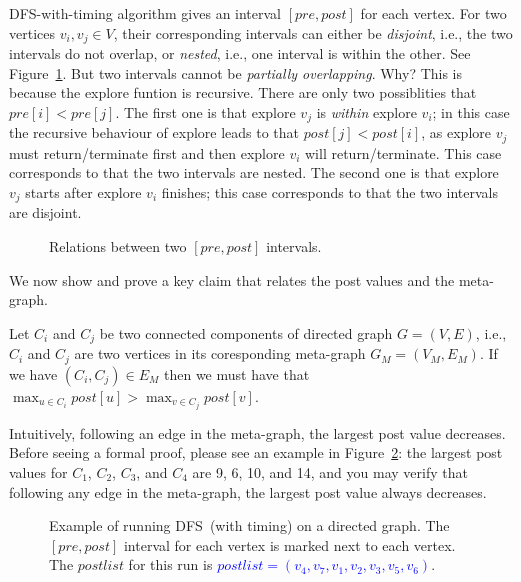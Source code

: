 DFS-with-timing algorithm gives an interval $[pre,post]$ for each vertex.
For two vertices $v_i,v_j\in V$, their corresponding intervals can either be
\emph{disjoint}, i.e., the two intervals do not overlap, or \emph{nested}, i.e.,
one interval is within the other. See Figure~\ref{fig:dfs-interval}.
But two intervals cannot be \emph{partially overlapping}. Why? This is because
the explore funtion is recursive. There are only two possiblities
that $pre[i] < pre[j]$. The first one is that explore $v_j$ is \emph{within} explore $v_i$;
in this case the recursive behaviour of explore leads to that $post[j] < post[i]$,
as explore $v_j$ must return/terminate first and then explore $v_i$ will return/terminate.
This case corresponds to that the two intervals are nested.
The second one is that explore $v_j$ starts after explore $v_i$ finishes;
this case corresponds to that the two intervals are disjoint.

\begin{figure}[h!]
\centering{}
\caption{Relations between two $[pre,post]$ intervals.}
\label{fig:dfs-interval}
\end{figure}

We now show and prove a key claim that relates the post values and the meta-graph.

\begin{claim}
Let $C_i$ and $C_j$ be two connected components of directed graph $G = (V, E)$, i.e., $C_i$ and $C_j$ are two
vertices in its coresponding meta-graph $G_M = (V_M, E_M)$. If we have $(C_i, C_j) \in E_M$ then
we must have that $\max_{u\in C_i} post[u] > \max_{v\in C_j} post[v]$.
\end{claim}

Intuitively, following an edge in the meta-graph, the largest post value decreases.
Before seeing a formal proof, please see an example in Figure~\ref{fig:dfs}:
the largest post values for $C_1$, $C_2$, $C_3$, and $C_4$ are 9, 6, 10, and 14,
and you may verify that following any edge in the meta-graph, the largest post value always decreases.

\begin{figure}[h!]
\centering{}
\caption{Example of running DFS~(with timing) on a directed graph. The $[pre,post]$ interval for each vertex
is marked next to each vertex.  The $postlist$ for this run is \textcolor{blue}{$postlist = (v_4,v_7,v_1,v_2,v_3,v_5,v_6)$}.  }
\label{fig:dfs}
\end{figure}




